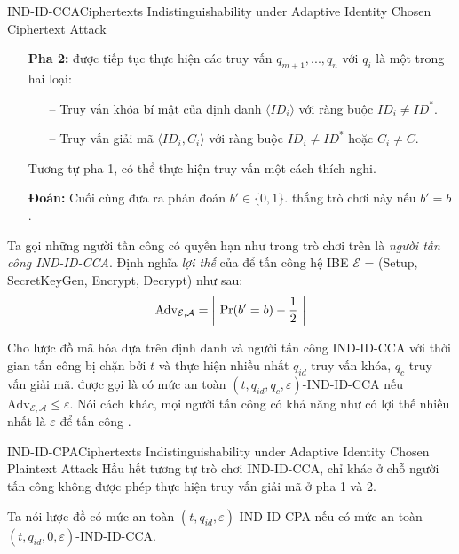 \documentclass[class=report, crop=false]{standalone}
\begin{document}
\begin{game}{IND-ID-CCA}{Ciphertexts Indistinguishability under Adaptive Identity Chosen Ciphertext Attack}
\begin{itemize}[leftmargin=1.5cm, itemindent=-0.5cm]
					\item[] \textbf{Pha 2:} \adversary được tiếp tục thực hiện các truy vấn $q_{m + 1}, ..., q_{n}$ với $q_i$ là một trong hai loại:
					\begin{itemize}
						\item[--] Truy vấn khóa bí mật của định danh $\langle ID_i \rangle$ với ràng buộc $ID_i \neq ID^*$.
						\item[--] Truy vấn giải mã $\langle ID_i, C_i \rangle$ với ràng buộc $ID_i \neq ID^*$ hoặc $C_i \neq C$.
					\end{itemize}
					Tương tự pha 1, \adversary có thể thực hiện truy vấn một cách thích nghi.
					\item[] \textbf{Đoán:} Cuối cùng \adversary đưa ra phán đoán $b' \in \{0, 1\}$. \adversary thắng trò chơi này nếu $b' = b$.
				\end{itemize}
				\vspace{-\baselineskip}
				Ta gọi những người tấn công có quyền hạn như \adversary trong trò chơi trên là \textit{người tấn công IND-ID-CCA}. Định nghĩa \textit{lợi thế} của \adversary để tấn công hệ IBE $\mathcal{E}$ = (\textsf{Setup, SecretKeyGen, Encrypt, Decrypt}) như sau:
				\[
					\text{Adv}_{\mathcal{E, A}} = \left| \ \text{Pr}(b' = b) - \frac{1}{2} \ \right|
				\]
			\end{game}
			\begin{definition}\label{def:cca}
				Cho lược đồ mã hóa dựa trên định danh \scheme và người tấn công IND-ID-CCA \adversary với thời gian tấn công bị chặn bởi $t$ và thực hiện nhiều nhất $q_{id}$ truy vấn khóa, $q_c$ truy vấn giải mã. \scheme được gọi là có mức an toàn $(t, q_{id}, q_c, \varepsilon)$-IND-ID-CCA nếu $\text{Adv}_{\mathcal{E, A}} \leq \varepsilon$. Nói cách khác, mọi người tấn công có khả năng như \adversary có lợi thế nhiều nhất là $\varepsilon$ để tấn công \scheme.
			\end{definition}
			\begin{game}{IND-ID-CPA}{Ciphertexts Indistinguishability under Adaptive Identity Chosen Plaintext Attack}
				Hầu hết tương tự trò chơi IND-ID-CCA, chỉ khác ở chỗ người tấn công không được phép thực hiện truy vấn giải mã ở pha 1 và 2.
			\end{game}
			\begin{definition}\label{def:cpa}
				Ta nói lược đồ \scheme có mức an toàn $(t, q_{id}, \varepsilon)$-IND-ID-CPA nếu \scheme có mức an toàn $(t, q_{id}, 0, \varepsilon)$-IND-ID-CCA.
			\end{definition}
\end{document}
